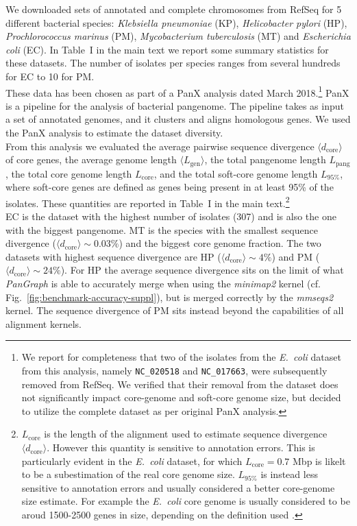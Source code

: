 \documentclass[aps,rmp,reprint,superscriptaddress,notitlepage,10pt,onecolumn]{revtex4-1}
\newcommand{\avg}[1]{\langle #1 \rangle}
\newcommand{\Lcore}{L_\text{core}}
\newcommand{\Lsoftcore}{L_\text{95\%}}
\newcommand{\Lpang}{L_\text{pang}}
\newcommand{\Lgen}{L_\text{gen}}
\newcommand{\dcore}{\langle d_\text{core} \rangle}
\begin{document}
We downloaded sets of annotated and complete chromosomes from RefSeq \cite{o2016reference} for 5 different bacterial species: \textit{Klebsiella pneumoniae} (KP), \textit{Helicobacter pylori} (HP), \textit{Prochlorococcus marinus} (PM), \textit{Mycobacterium tuberculosis} (MT) and \textit{Escherichia coli} (EC). In Table~I in the main text we report some summary statistics for these datasets. The number of isolates per species ranges from several hundreds for EC to 10 for PM.\\
These data has been chosen as part of a PanX \cite{ding2018panx} analysis dated March 2018.\footnote{
    We report for completeness that two of the isolates from the \textit{E.~coli} dataset from this analysis, namely \texttt{NC\_020518} and  \texttt{NC\_017663}, were subsequently removed from RefSeq. We verified that their removal from the dataset does not significantly impact core-genome and soft-core genome size, but decided to utilize the complete dataset as per original PanX analysis.
}
PanX is a pipeline for the analysis of bacterial pangenome. The pipeline takes as input a set of annotated genomes, and it clusters and aligns homologous genes. We used the PanX analysis to estimate the dataset diversity.\\
From this analysis we evaluated the average pairwise sequence divergence $\avg{d_\text{core}}$ of core genes, the average genome length $\avg{\Lgen}$, the total pangenome length $\Lpang$, the total core genome length $\Lcore$, and the total soft-core genome length $\Lsoftcore$, where soft-core genes are defined as genes being present in at least 95\% of the isolates. These quantities are reported in Table~I in the main text.\footnote{
    $\Lcore$ is the length of the alignment used to estimate sequence divergence $\avg{d_\text{core}}$. However this quantity is sensitive to annotation errors. This is particularly evident in the \textit{E.~coli} dataset, for which $\Lcore = 0.7$ Mbp is likelt to be a subestimation of the real core genome size. $\Lsoftcore$ is instead less sensitive to annotation errors and usually considered a better core-genome size estimate. For example the \textit{E.~coli} core genome is usually considered to be aroud 1500-2500 genes in size, depending on the definition used \cite{park2019large,sutton2021pan,horsfield2023accurate}.
}\\
EC is the dataset with the highest number of isolates (307) and is also the one with the biggest pangenome. MT is the species with the smallest sequence divergence ($\dcore \sim 0.03\%$) and the biggest core genome fraction. The two datasets with highest sequence divergence are HP ($\dcore \sim 4\%$) and PM ($\dcore \sim 24\%$). For HP the average sequence divergence sits on the limit of what \textit{PanGraph} is able to accurately merge when using the \textit{minimap2} kernel (cf. Fig.~\ref{fig:benchmark-accuracy-suppl}), but is merged correctly by the \textit{mmseqs2} kernel. The sequence divergence of PM sits instead beyond the capabilities of all alignment kernels.
\end{document}
